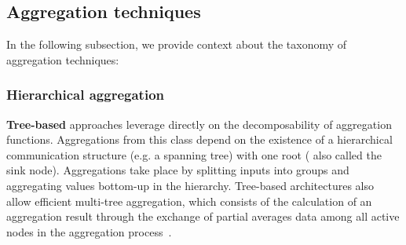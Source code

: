 \begin{table}[]
    \centering
    \caption{Decomposability and duplicate sensitiveness of aggregation functions}
    \label{table:aggregation_functions}
\end{table}



\subsection{Aggregation techniques}

In the following subsection, we provide context about the taxonomy of aggregation techniques:

\subsubsection*{Hierarchical aggregation}

\textbf{Tree-based} approaches leverage directly on the decomposability of aggregation functions. Aggregations from this class depend on the existence of a hierarchical communication structure (e.g. a spanning tree) with one root ( also called the sink node). Aggregations take place by splitting inputs into groups and aggregating values bottom-up in the hierarchy.  Tree-based architectures also allow efficient multi-tree aggregation, which consists of the calculation of an aggregation result through the exchange of partial averages data among all active nodes in the aggregation process~\cite{akosThesis}. 

